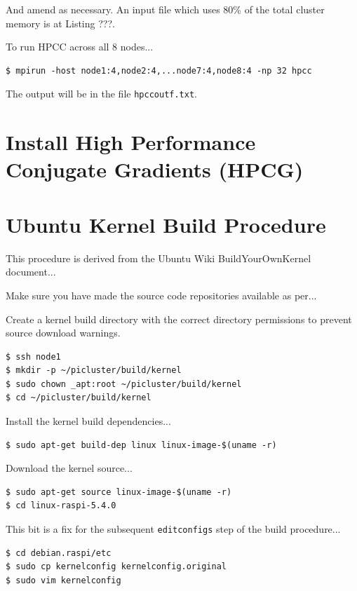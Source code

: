 \documentclass{report}
\begin{document}
And amend as necessary. An input file which uses 80\% of the total cluster memory is at Listing ???.

To run HPCC across all 8 nodes...

\lstset{style=termstyle}
\begin{lstlisting}
$ mpirun -host node1:4,node2:4,...node7:4,node8:4 -np 32 hpcc
\end{lstlisting}

The output will be in the file \verb|hpccoutf.txt|.




%
%
\chapter{Install High Performance Conjugate Gradients (HPCG)}


%
%
\chapter{Ubuntu Kernel Build Procedure}

This procedure is derived from the Ubuntu Wiki BuildYourOwnKernel document...

Make sure you have made the source code repositories available as per...

Create a kernel build directory with the correct directory permissions to prevent source download warnings. 

\lstset{style=termstyle}
\begin{lstlisting}
$ ssh node1
$ mkdir -p ~/picluster/build/kernel
$ sudo chown _apt:root ~/picluster/build/kernel
$ cd ~/picluster/build/kernel
\end{lstlisting}

Install the kernel build dependencies...

\lstset{style=termstyle}
\begin{lstlisting}
$ sudo apt-get build-dep linux linux-image-$(uname -r)
\end{lstlisting}

Download the kernel source...

\lstset{style=termstyle}
\begin{lstlisting}
$ sudo apt-get source linux-image-$(uname -r)
$ cd linux-raspi-5.4.0
\end{lstlisting}

This bit is a fix for the subsequent \verb|editconfigs| step of the build procedure...

\lstset{style=termstyle}
\begin{lstlisting}
$ cd debian.raspi/etc
$ sudo cp kernelconfig kernelconfig.original
$ sudo vim kernelconfig
\end{lstlisting}
\end{document}

